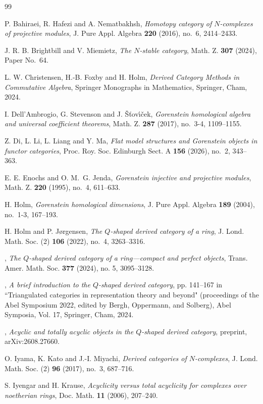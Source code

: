 \documentclass{amsart}
\theoremstyle{bfupright head,slanted body}
\theoremstyle{bfupright head,upright body}
\theoremstyle{fixed bf head,slanted body}
\theoremstyle{fixed bf head,upright body}
\theoremstyle{numbered paragraph}
\numberwithin{equation}{res}
\begin{document}
\begin{thebibliography}{99}

P. Bahiraei, R. Hafezi and A. Nematbakhsh,
\emph{Homotopy category of $N$-complexes of projective modules},
J. Pure Appl. Algebra \textbf{220} (2016), no.~6, 2414--2433.

J. R. B. Brightbill and V. Miemietz,
\emph{The $N$-stable category},
Math. Z. \textbf{307} (2024), Paper No.~64.

L. W. Christensen, H.-B. Foxby and H. Holm,
\emph{Derived Category Methods in Commutative Algebra},
Springer Monographs in Mathematics, Springer, Cham, 2024.

I. Dell'Ambrogio, G. Stevenson and J. \v{S}\v{t}ov\'{\i}\v{c}ek,
\emph{Gorenstein homological algebra and universal coefficient theorems},
Math. Z. \textbf{287} (2017), no.~3-4, 1109--1155.

Z. Di, L. Li, L. Liang and Y. Ma,
\emph{Flat model structures and {G}orenstein objects in functor categories},
Proc. Roy. Soc. Edinburgh Sect. A \textbf{156} (2026), no.~2, 343--363.

E. E. Enochs and O. M.~G. Jenda, \emph{Gorenstein injective and projective modules},
Math. Z. \textbf{220} (1995), no.~4, 611--633.

H. Holm, \emph{Gorenstein homological dimensions},
J. Pure Appl. Algebra \textbf{189} (2004), no.~1-3, 167--193.

H. Holm and P. J{\o}rgensen,
\emph{The $Q$-shaped derived category of a ring},
J. Lond. Math. Soc. (2) \textbf{106} (2022), no.~4, 3263--3316.

\bysame,
\emph{The $Q$-shaped derived category of a ring---compact and perfect objects},
Trans. Amer. Math. Soc. \textbf{377} (2024), no. 5, 3095--3128.

\bysame,
\emph{A brief introduction to the $Q$-shaped derived category},
pp. 141--167 in ``Triangulated categories in representation theory and beyond" (proceedings of the Abel Symposium 2022, edited by Bergh, Oppermann, and Solberg), Abel Symposia, Vol. 17, Springer, Cham, 2024.

\bysame,
\emph{Acyclic and totally acyclic objects in the $Q$-shaped derived category},
preprint, arXiv:2608.27660.

O. Iyama, K. Kato and J.-I. Miyachi,
\emph{Derived categories of $N$-complexes},
J. Lond. Math. Soc. (2) \textbf{96} (2017), no.~3, 687--716.

S. Iyengar and H. Krause,
\emph{Acyclicity versus total acyclicity for complexes over noetherian rings},
Doc. Math. \textbf{11} (2006), 207--240.

\end{thebibliography}
\end{document}
